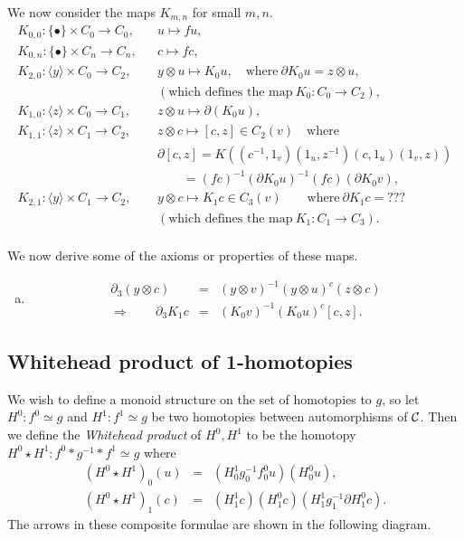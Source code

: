 \newpage
We now consider the maps $K_{m,n}$ for small $m,n$. 
\begin{eqnarray*}
K_{0,0} : \{\bullet\}\times C_0 \to C_0,  
  &&  u \mapsto fu, \\
K_{0,n} : \{\bullet\}\times C_n \to C_n,  
  &&  c \mapsto fc, \\
K_{2,0} : \langle y \rangle \times C_0 \to C_2,  
  &&  y \otimes u \mapsto K_0 u, 
      \quad\text{where}~ \partial K_0 u = z \otimes u, \\
  &&  (\text{which defines the map}~ K_0 : C_0 \to C_2), \\
K_{1,0} : \langle z \rangle \times C_0 \to C_1,  
  &&  z \otimes u \mapsto \partial(K_0u), \\
K_{1,1} : \langle z \rangle \times C_1 \to C_2,  
  &&  z \otimes c \mapsto [c,z] \in C_2(v) \quad \text{where} \\
  &&  \partial[c,z] = K\left((c^{-1},1_v)(1_u,z^{-1})(c,1_u)(1_v,z)\right) \\
  &&  \quad\quad = (fc)^{-1}(\partial K_0u)^{-1}(fc)(\partial K_0 v), \\
K_{2,1} : \langle y \rangle \times C_1 \to C_2,  
  &&  y \otimes c \mapsto K_1c \in C_3(v) 
      \qquad\text{where}~ \partial K_1 c = ??? \\
  &&  (\text{which defines the map}~ K_1 : C_1 \to C_3). \\
\end{eqnarray*}

\noindent
We now derive some of the axioms or properties of these maps. 

\noindent
\begin{enumerate}[(a)] 
\item

\begin{eqnarray*}
\partial_3(y \otimes c) 
  &=&  (y \otimes v)^{-1}(y \otimes u)^c(z \otimes c) \\
\Rightarrow \qquad \partial_3 K_1c 
  &=& (K_0 v)^{-1} (K_0 u)^c [c,z].
\end{eqnarray*}
\end{enumerate}


\newpage
\subsection{Whitehead product of 1-homotopies}
\label{subsect:wprod-xcomp}

We wish to define a monoid structure on the set of homotopies to $g$, 
so let $H^0 : f^0 \simeq g$ and $H^1 : f^1 \simeq g$ be two homotopies 
between automorphisms of $\mathcal{C}$. 
Then we define the \emph{Whitehead product} of $H^0,H^1$ to be 
the homotopy $H^0 \star H^1 : f^0*g^{-1}*f^1 \simeq g$ where 
\begin{eqnarray*}
(H^0 \star H^1)_0(u) &=& (H^1_0g^{-1}_0f^0_0u)(H^0_0u), \\ 
(H^0 \star H^1)_1(c) &=& (H^1_1c)(H^0_1c)(H^1_1g^{-1}_1\partial H^0_1c). 
\end{eqnarray*}
The arrows in these composite formulae are shown in the following diagram.

